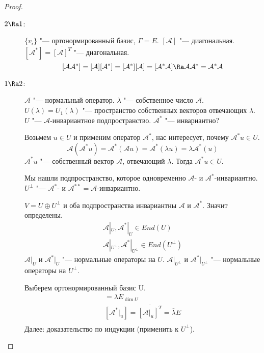 \begin{proof}
	\begin{description}
	\item[$2 \Ra 1$:]
		$\{v_i\}$ "--- ортонормированный базис, $\Gamma = E$.
		$[\mathcal A] $ "--- диагональная.
		$[\mathcal{A}^*] = \overline{[\mathcal A]^T}$ "--- диагональная.
		\[
			[\mathcal A\mathcal{A}^*]
			= [\mathcal A][\mathcal{A}^*]
			= [\mathcal{A}^*][\mathcal A]
			= [\mathcal{A}^*\mathcal A]
			\Ra \mathcal A\mathcal{A}^*
			= \mathcal{A}^*\mathcal A
		\]

	\item[$1 \Ra 2$:]
		$\mathcal A$ "--- нормальный оператор.
		$\lambda$ "--- собственное число $\mathcal A$.
		$U(\lambda) = U_1(\lambda)$ "--- пространство собственных векторов отвечающих $\lambda$.
		$U$ "--- $\mathcal A$-инвариантное подпространство.
		$\mathcal{A}^*$ "--- инвариантно?

		Возьмем $u \in U$ и применим оператор $\mathcal{A}^*$, нас интересует, почему $\mathcal{A}^*u \in U$.
		\[ \mathcal A(\mathcal{A}^*u) = \mathcal{A}^*(\mathcal Au) = \mathcal{A}^*(\lambda u) = \lambda \mathcal{A}^*(u) \]
		$\mathcal{A}^*u$ "--- собственный вектор $\mathcal A$, отвечающий $\lambda$.
		Тогда $\mathcal{A}^*u \in U$.

		Мы нашли подпространство, которое одновременно $\mathcal A$- и $\mathcal{A}^*$-инвариантно.
		$U^{\bot}$ "--- $\mathcal{A}^*$- и $\mathcal{A}^{**} = \mathcal A$-инвариантно.

		$V = U \oplus U^{\bot}$ и оба подпространства инвариантны $\mathcal A$ и $\mathcal{A}^*$.
		Значит определены.
		\begin{gather*}
			\mathcal A|_U, \mathcal{A}^*|_U \in End(U) \\
			\mathcal A|_{U^{\bot}}, \mathcal{A}^*|_{U^{\bot}} \in End(U^{\bot})
		\end{gather*}
		$\mathcal A|_U$ и $\mathcal{A}^*|_U$ "--- нормальные операторы на $U$.
		$\mathcal A|_{U^{\bot}}$ и $\mathcal{A}^*|_{U^{\bot}}$ "--- нормальные операторы на $U^{\bot}$.

		Выберем ортонормированный базис U.
		\begin{gather*}
			[\mathcal A|_u] = \lambda E_{\dim U} \\
			[\mathcal{A}^*|_u] = \overline{[\mathcal A|_u]^T} = \overline{\lambda}E \\
		\end{gather*}
		Далее: доказательство по индукции (применить к $U^{\bot}$).
	\end{description}
\end{proof}

